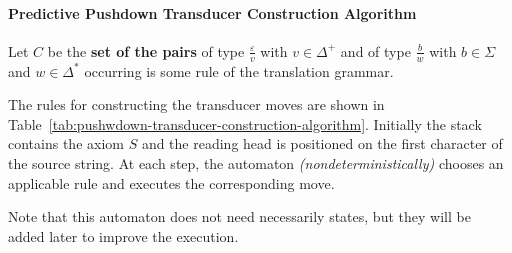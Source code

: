 \documentclass[english]{article}
\begin{document}
\paragraph{Predictive Pushdown Transducer Construction Algorithm}
\label{par:predictive-pushdown-tansducer-construction-algorithm}

Let \(C\) be the \textbf{set of the pairs} of type \(\frac{\varepsilon}{v}\) with \(v \in \Delta^+\) and of type \(\frac{b}{w}\) with \(b \in \Sigma\) and \(w \in \Delta^\ast\) occurring is some rule of the translation grammar.

The rules for constructing the transducer moves are shown in Table~\ref{tab:pushwdown-transducer-construction-algorithm}.
Initially the stack contains the axiom \(S\) and the reading head is positioned on the first character of the source string.
At each step, the automaton \textit{(nondeterministically)} chooses an applicable rule and executes the corresponding move.

Note that this automaton does not need necessarily states, but they will be added later to improve the execution.
\end{document}
